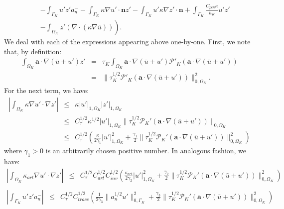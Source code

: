 \documentclass[11pt]{article}
\newenvironment{proof}[1][Proof]{\begin{trivlist}
\item[\hskip \labelsep {\bfseries #1}]}{\end{trivlist}}
\begin{document}
\begin{proof}
\begin{eqnarray}
&& - \int_{\Gamma_K} u' z' a_n^- - \int_{\Gamma_K} \kappa \nabla u' \cdot \bm{n} z' - \int_{\Gamma_K} u' \kappa \nabla z' \cdot \bm{n} + \int_{\Gamma_K} \frac{C_{pen} \kappa}{h_K} u' z' \nonumber \\
&& \left. - \int_{\Omega_K} z' \left(\nabla \cdot \left( \kappa \nabla \bar{u} \right) \right) \right).
\end{eqnarray}
We deal with each of the expressions appearing above one-by-one.  First, we note that, by definition:
\begin{eqnarray}
\int_{\Omega_K} \bm{a} \cdot \nabla \left( \bar{u} + u' \right) z' &=& \tau_K \int_{\Omega_K} \bm{a} \cdot \nabla \left( \bar{u} + u' \right) \mathcal{P}'_K \left( \bm{a} \cdot \nabla \left( \bar{u} + u' \right) \right) \nonumber \\
&=& \| \tau_K^{1/2} \mathcal{P}'_K \left( \bm{a} \cdot \nabla \left( \bar{u} + u' \right) \right) \|^2_{0,\Omega_K}.
\end{eqnarray}
For the next term, we have:
\begin{eqnarray}
\left| \int_{\Omega_K} \kappa \nabla u' \cdot \nabla z' \right| & \leq & \kappa | u' |_{1,\Omega_K} | z' |_{1,\Omega_K} \nonumber \\
& \leq & C^{1/2}_{\tau} \kappa^{1/2} | u' |_{1,\Omega_K} \| \tau^{1/2}_K \mathcal{P}_K' \left( \bm{a} \cdot \nabla \left( \bar{u} + u' \right) \right) \|_{0,\Omega_K} \nonumber \\
& \leq & C^{1/2}_{\tau} \left( \frac{\kappa}{2\gamma_1} | u' |_{1,\Omega_K}^2 + \frac{\gamma_1}{2} \| \tau^{1/2}_K \mathcal{P}_K' \left( \bm{a} \cdot \nabla \left( \bar{u} + u' \right) \right) \|_{0,\Omega_K}^2 \right)
\end{eqnarray}
where $\gamma_1 > 0$ is an arbitrarily chosen positive number.  In analogous fashion, we have:
\begin{eqnarray}
\left| \int_{\Omega_K} \kappa_{art} \nabla u' \cdot \nabla z' \right| & \leq & C^{1/2}_{\tau} C^{1/2}_{art} C^{1/2}_{inv} \left( \frac{\kappa_{art}}{2\gamma_2} | u' |_{1,\Omega_K}^2 + \frac{\gamma_2}{2} \| \tau^{1/2}_K \mathcal{P}_K' \left( \bm{a} \cdot \nabla \left( \bar{u} + u' \right) \right) \|_{0,\Omega_K}^2 \right) \nonumber \\
\end{eqnarray}
\begin{eqnarray}
\left| \int_{\Gamma_K} u' z' a_n^- \right| & \leq & C^{1/2}_{\tau} C^{1/2}_{trace} \left( \frac{1}{2\gamma_3} \| a_n^{1/2} u' \|_{0,\Gamma_K}^2 + \frac{\gamma_3}{2} \| \tau^{1/2}_K \mathcal{P}_K' \left( \bm{a} \cdot \nabla \left( \bar{u} + u' \right) \right) \|_{0,\Omega_K}^2 \right) \nonumber \\

\end{eqnarray}
\end{proof}
\end{document}
